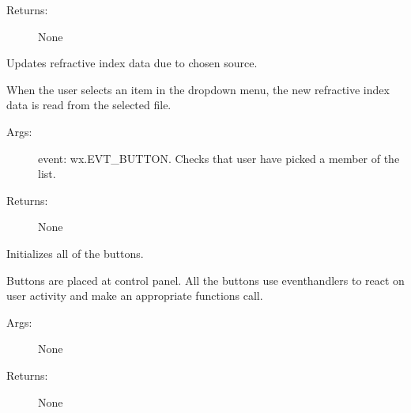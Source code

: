 \documentclass[letterpaper,10pt,english]{sphinxmanual}
\begin{document}
\begin{fulllineitems}
\begin{fulllineitems}
\begin{description}
\item[{Returns:}] \leavevmode
None

\end{description}

\end{fulllineitems}


\begin{fulllineitems}
\label{\detokenize{GUI:GUI.MyPanel.on_select}}
Updates refractive index data due to chosen source.

When the user selects an item in the drop\sphinxhyphen{}down menu, the new refractive index data is read from the selected file.
\begin{description}
\item[{Args:}] \leavevmode
event: wx.EVT\_BUTTON. Checks that user have picked a member of the list.

\item[{Returns:}] \leavevmode
None

\end{description}

\end{fulllineitems}


\begin{fulllineitems}
\label{\detokenize{GUI:GUI.MyPanel.show_buttons}}
Initializes all of the buttons.

Buttons are placed at control panel. All the buttons use event\sphinxhyphen{}handlers
to react on user activity and make an appropriate functions call.
\begin{description}
\item[{Args:}] \leavevmode
None

\item[{Returns:}] \leavevmode
None

\end{description}

\end{fulllineitems}


\end{fulllineitems}
\end{document}
